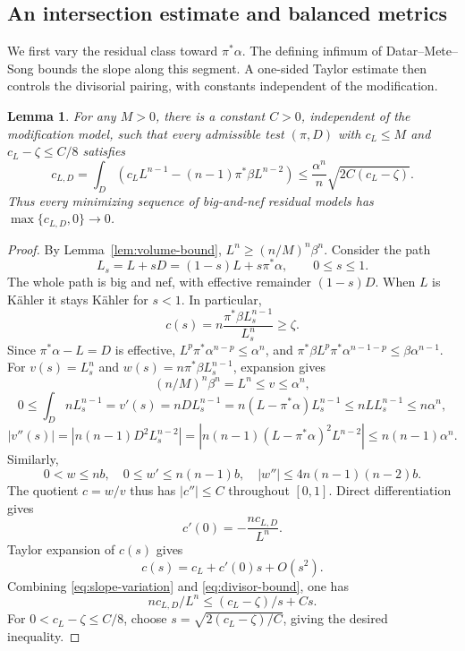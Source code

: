 \documentclass[reqno]{amsart}
\numberwithin{equation}{section}
\newtheorem{lemma}[theorem]{Lemma}
\theoremstyle{definition}
\newcommand{\cld}{c_{L,D}}
\begin{document}
\subsection{An intersection estimate and balanced metrics}
We first vary the residual class toward $\pi^*\alpha$.
The defining infimum of Datar--Mete--Song \cite{DMS26} bounds
the slope along this segment. A one-sided Taylor estimate
then controls the divisorial pairing, with constants independent
of the modification.
\begin{lemma}\label{lem:orthogonality}
For any $M>0$, there is a constant $C>0$, independent of the modification model, such that every admissible test $(\pi,D)$ with $c_L\le M$ and $c_L-\zeta\le C/8$ satisfies
\begin{equation}\label{eq:divisor-pairing}
\cld=\int_D(c_LL^{n-1}-(n-1)\pi^*\beta L^{n-2})\le \frac{\alpha^n}{n}\sqrt{2C(c_L-\zeta)}.
\end{equation}
Thus every minimizing sequence of big-and-nef residual models has $\max\{\cld,0\}\to 0$.
\end{lemma}
\begin{proof}
   By Lemma~\ref{lem:volume-bound}, $L^n\geq (n/M)^n\beta^n$. Consider the path
\begin{equation}\label{eq:orthogonality}
L_s=L+sD=(1-s)L+s\pi^*\alpha,\qquad 0\le s\le1.
\end{equation}
The whole path is big and nef, with effective remainder $(1-s)D$. When $L$ is K\"ahler it stays K\"ahler for $s<1$. In particular,
\begin{equation}\label{eq:slope-variation}
c(s)=n\frac{\pi^*\beta L_s^{n-1}}{L_s^n}\ge\zeta.
\end{equation}
Since $\pi^*\alpha-L=D$ is effective,  $L^{p}\pi^*\alpha^{n-p}\leq\alpha^n$, and $\pi^*\beta L^{p}\pi^*\alpha^{n-1-p}\leq \beta\alpha^{n-1}$. 
For $v(s)=L_s^n$ and $w(s)=n\pi^*\beta L_s^{n-1}$, expansion gives 
\[
(n/M)^n\beta^n=L^n\le v\leq \alpha^n,
\]
\[
0\leq \int_DnL_s^{n-1}=v'(s)= nDL_s^{n-1}=n(L-\pi^*\alpha)L_s^{n-1}\leq nLL_{s}^{n-1}\leq n\alpha^n,
\]\[
|v''(s)|=|n(n-1)D^2L_s^{n-2}|=|n(n-1)(L-\pi^*\alpha)^2L^{n-2}|\leq n(n-1)\alpha^n.
\]
Similarly, 
\[
0<w\le nb,\quad 0\le w'\le n(n-1)b,\quad
|w''|\le4n(n-1)(n-2)b.
\]
The quotient $c=w/v$ thus has $|c''|\le C$ throughout $[0,1]$.
Direct differentiation gives
\begin{equation}\label{eq:divisor-bound}
c'(0)=-\frac{n \cld}{L^n}.
\end{equation} Taylor expansion of $c(s)$ gives 
\[
c(s)=c_L+c'(0)s+O(s^2).
\]
Combining \eqref{eq:slope-variation} and \eqref{eq:divisor-bound}, one has \[
n\cld/L^n\leq (c_L-\zeta)/s+Cs.
\]
For $0<c_L-\zeta\le C/8$, choose $s=\sqrt{2(c_L-\zeta)/C}$, giving the desired inequality.
\end{proof}
\end{document}
